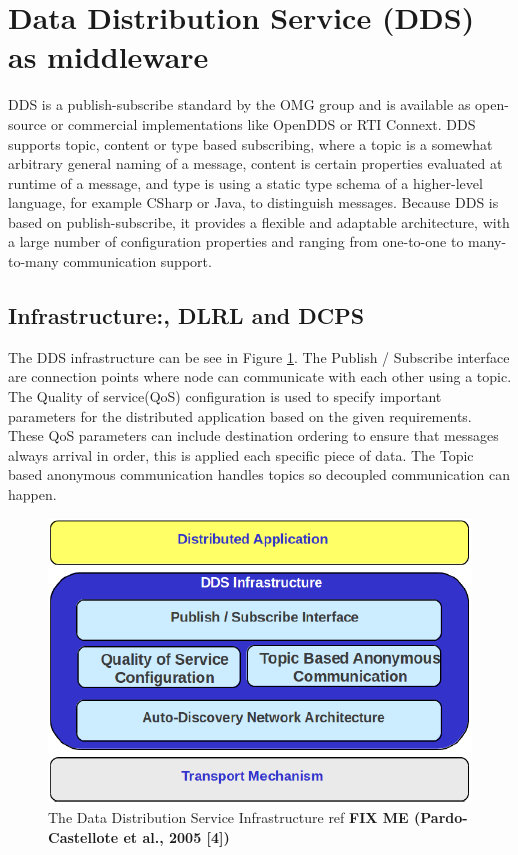 \section{Data Distribution Service (DDS) as middleware}

DDS is a publish-subscribe standard by the OMG group and is available as open-source or commercial implementations like OpenDDS or RTI Connext. DDS supports topic, content or type based subscribing, where a topic is a somewhat arbitrary general naming of a message, content is certain properties evaluated at runtime of a message, and type is using a static type schema of a higher-level language, for example CSharp or Java, to distinguish messages. Because DDS is based on publish-subscribe, it provides a flexible and adaptable architecture, with a large number of configuration properties and ranging from one-to-one to many-to-many communication support.

\subsection{Infrastructure:, DLRL and DCPS}
The DDS infrastructure can be see in Figure \ref{fig:DDSIinfrastructure}. The Publish / Subscribe interface are connection points where node can communicate with each other using a topic. The Quality of service(QoS) configuration is used to specify important parameters for the distributed application based on the given requirements. These QoS parameters can include destination ordering to ensure that messages always arrival in order, this is applied each specific piece of data. The Topic based anonymous communication handles topics so  decoupled communication can happen.

\begin{figure}[ht!]
	\centering
	\includegraphics[scale=0.8]{middleware/DDSIinfrastructure.png}
	\caption{The Data Distribution Service Infrastructure ref \textbf{ FIX ME (Pardo-Castellote et al., 2005 [4])}}
	\label{fig:DDSIinfrastructure}
\end{figure}

